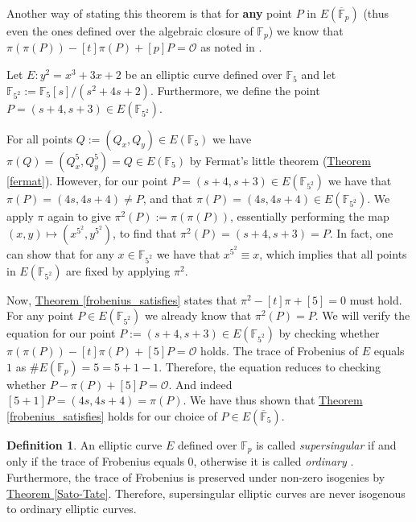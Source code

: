 \documentclass[openany, a4paper, 10pt]{book}
\theoremstyle{plain}
\theoremstyle{plain}
\theoremstyle{plain}
\theoremstyle{definition}
\newtheorem{definition}[theorem]{Definition}
\theoremstyle{plain}
\theoremstyle{definition}
\theoremstyle{remark}
\newcommand{\theoref}[1]{\hyperref[#1]{Theorem \ref{#1}}}
\begin{document}
Another way of stating this theorem is that for \textbf{any} point $P$ in $E(\overline {\mathbb F}_p)$ (thus even the ones defined over the algebraic closure of $\mathbb F_p$)
we know that $\pi(\pi(P)) - [t]\pi(P) + [p]P = \mathcal O$ as noted in \cite[p.~6]{ideals_on_curves}.
\begin{examplebox}
    Let $E: y^2 = x^3 + 3x + 2$ be an elliptic curve defined over $\mathbb F_{5}$ and let $\mathbb F_{5^2} := \mathbb F_5[s]/(s^2+4s+2)$.
    Furthermore, we define the point $P=(s+4,s+3) \in E(\mathbb F_{5^2})$.

    For all points $Q := (Q_x, Q_y) \in E(\mathbb F_5)$ we have $\pi(Q) = (Q_x^5, Q_y^5) = Q \in E(\mathbb F_5)$ by Fermat's little theorem (\theoref{fermat}).
    However, for our point $P=(s+4,s+3)\in E(\mathbb F_{5^2})$ we have that $\pi(P) = (4s, 4s+4) \neq P$, and that $\pi(P) = (4s, 4s+4) \in E(\mathbb F_{5^2})$.
    We apply $\pi$ again to give $\pi^2(P):=\pi(\pi(P))$, essentially performing the map $(x, y) \mapsto (x^{5^2}, y^{5^2})$, to find that $\pi^2(P) = (s+4, s+3) = P$.
    In fact, one can show that for any $x \in \mathbb F_{5^2}$ we have that $x^{5^2} \equiv x$, which implies that all points in $E(\mathbb F_{5^2})$ are fixed by applying $\pi^2$.

    Now, \theoref{frobenius_satisfies} states that $\pi^2 - [t]\pi + [5] = 0$ must hold.
    For any point $P \in E(\mathbb F_{5^2})$ we already know that $\pi^2(P) = P$.
    We will verify the equation for our point $P:= (s+4, s+3) \in E(\mathbb F_{5^2})$ by checking whether $\pi(\pi(P)) -[t]\pi(P) + [5]P = \mathcal O$ holds.
    The trace of Frobenius of $E$ equals $1$ as $\#E(\mathbb F_p)=5=5+1-1$.
    Therefore, the equation reduces to checking whether $P - \pi(P) + [5]P = \mathcal O$.
    And indeed $[5+1]P = (4s, 4s+4) = \pi(P)$.
    We have thus shown that \theoref{frobenius_satisfies} holds for our choice of $P \in E(\overline {\mathbb F}_5)$.
\end{examplebox}

\begin{definition}\label{is_supersing}
    An elliptic curve $E$ defined over $\mathbb F_p$ is called \textit{supersingular} if and only if the trace of Frobenius equals 0, otherwise it is called \textit{ordinary} \cite[Theorem~13.4]{supersingular_curves}.
    Furthermore, the trace of Frobenius is preserved under non-zero isogenies by \theoref{Sato-Tate}.
    Therefore, supersingular elliptic curves are never isogenous to ordinary elliptic curves.
\end{definition}
\end{document}
